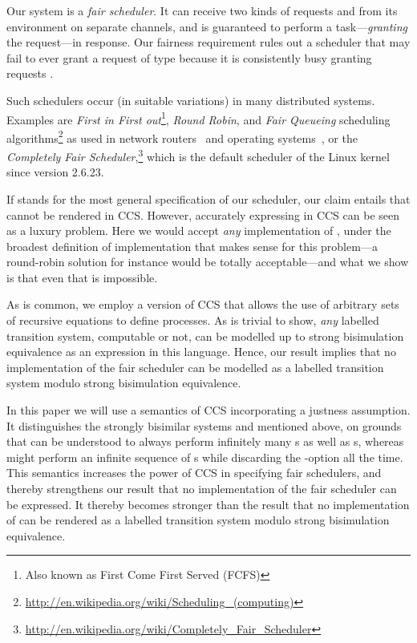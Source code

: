 \documentclass[smallcondensed]{svjour3}
\begin{document}
Our system is a \emph{fair scheduler}. It can receive two
kinds of requests  and  from its environment on separate channels, and is guaranteed to perform a
task---\emph{granting} the request---in response. Our fairness requirement rules out a scheduler that
may fail to ever grant a request of type  because it is consistently busy granting requests .

Such schedulers occur
(in suitable variations)
in many distributed systems.
Examples are \emph{First in First out}\footnote{Also known as First Come First Served (FCFS)},
\emph{Round Robin}, and
\emph{Fair Queueing} 
scheduling algorithms\footnote{\url{http://en.wikipedia.org/wiki/Scheduling_(computing)}}
as used in network routers~\cite{rfc970,Nagle87} and operating systems~\cite{Kleinrock64},
or the \emph{Completely Fair Scheduler},\footnote{\url{http://en.wikipedia.org/wiki/Completely_Fair_Scheduler}}
which is the default scheduler of the Linux kernel since version 2.6.23.

If  stands for the most general specification of our scheduler, our claim entails that 
 cannot be rendered in CCS\@. However, accurately expressing  in CCS can
be seen as a luxury problem. Here we would accept \emph{any} implementation of , under the
broadest definition of implementation that makes sense for this problem---a round-robin solution for
instance would be totally acceptable---and what we show is that even that is
impossible.

As is common, we employ a version of CCS that allows the use of arbitrary sets of recursive equations to define processes.
As is trivial to show, \emph{any} labelled transition system, computable or 
not, can be modelled up to strong bisimulation equivalence as an expression in this
language. Hence, our result implies that no implementation of the fair scheduler  can be modelled as
a labelled transition system modulo strong bisimulation equivalence.

In this paper we will use a semantics of CCS incorporating a justness assumption. It distinguishes the strongly bisimilar systems 
and  mentioned above, on grounds that  can be understood to always perform infinitely many
s as well as s, whereas  might perform an infinite sequence of s while discarding the
-option all the time. This semantics increases the power of CCS in specifying fair schedulers,
and thereby strengthens our result that no implementation of the fair scheduler  can be
expressed. It thereby becomes stronger than the result that no implementation of  can be
rendered as a labelled transition system modulo strong bisimulation equivalence.
\end{document}
